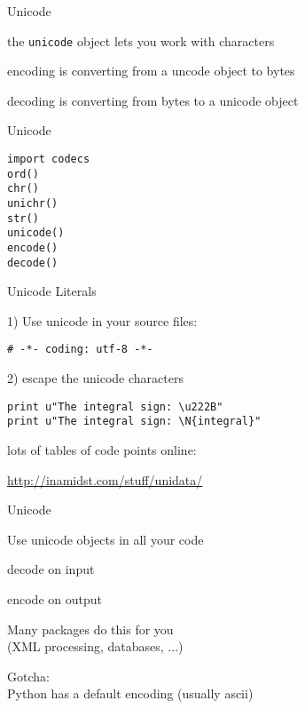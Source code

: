 \documentclass{beamer}
\begin{document}
\begin{frame}[fragile]{Unicode}

{\Large
\vfill
the \verb|unicode| object lets you work with characters

\vfill
encoding is converting from a uncode object to bytes

\vfill
decoding is converting from bytes to a unicode object

}
\vfill
\end{frame}

\begin{frame}[fragile]{Unicode}

\begin{verbatim}
import codecs
ord()
chr()
unichr()
str()
unicode()
encode()
decode()
\end{verbatim}
\end{frame}

\begin{frame}[fragile]{Unicode Literals}


{\Large 1) Use unicode in your source files:}

\begin{verbatim}
# -*- coding: utf-8 -*-
\end{verbatim}

\vfill
{\Large 2) escape the unicode characters}

\begin{verbatim}
print u"The integral sign: \u222B"
print u"The integral sign: \N{integral}"
\end{verbatim}

{\large lots of tables of code points online:}

\url{http://inamidst.com/stuff/unidata/}

\end{frame}


\begin{frame}[fragile]{Unicode}

{\Large
Use unicode objects in all your code

\vfill
decode on input

\vfill
encode on output

\vfill
Many packages do this for you\\
\hspace{0.25in} (XML processing, databases, ...)

\vfill
Gotcha:\\
\hspace{0.25in} Python has a default encoding (usually ascii)
}
\end{frame}
\end{document}
